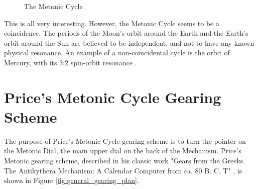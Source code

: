 \documentclass[11pt, oneside]{article}   	%
\theoremstyle{definition}
\begin{document}
\bigskip
\bigskip
\begin{figure}[H]
  \caption{The Metonic Cycle \cite{youtube:freeth2021}}
  \label{fig:metonic_cycle}
\end{figure}

\bigskip
\bigskip
\noindent
This is all very interesting. However, the Metonic Cycle seems to be a coincidence. The periods of the Moon's orbit around the Earth and the Earth's 
orbit around the Sun are believed to be independent, and not to have any known physical resonance. An example of a non-coincidental 
cycle is the orbit of Mercury, with its 3:2 spin-orbit resonance \cite{Correia2004}. 

\section{Price's Metonic Cycle Gearing Scheme}
The purpose of Price's  Metonic Cycle gearing scheme is to turn the pointer on the Metonic Dial, the main upper dial on the back of the Mechanism. 
Price's Metonic gearing scheme, described in his classic work "Gears from the Greeks. The Antikythera Mechanism: A Calendar Computer from 
ca. 80 B. C. T" \cite{gears_from_the_greeks},  is shown in Figure \ref{fig:general_gearing_plan}. 
\end{document}
